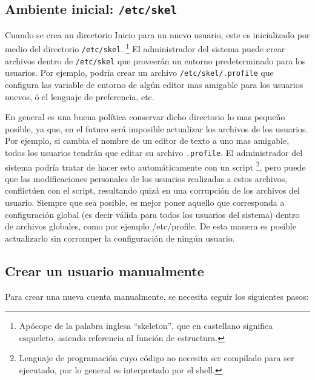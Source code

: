 \documentclass[12pt]{article}
\begin{document}
\subsection*{Ambiente inicial: \texttt{/etc/skel}}

Cuando se crea un directorio Inicio para un nuevo usuario, este es
inicializado por medio del directorio \texttt{/etc/skel}. 
\footnote{Apócope de la palabra inglesa ``skeleton'', que en castellano 
significa esqueleto, asiendo referencia al función de estructura.} El
administrador del sistema puede crear archivos dentro de
\texttt{/etc/skel} que proveerán un entorno predeterminado
para los usuarios. Por ejemplo, podría crear un archivo 
\texttt{/etc/skel/.profile} que configura las variable de entorno
de algún editor mas amigable para los usuarios nuevos, ó el lenguaje 
de preferencia, etc. 


En general es una buena política conservar dicho directorio lo mas pequeño
posible, ya que, en el futuro será imposible actualizar los archivos de
los usuarios. Por ejemplo, si cambia el nombre de un editor de texto a uno mas amigable,
todos los usuarios tendrán que editar su archivo  \texttt{.profile}.
El administrador del sistema podría tratar de hacer esto automáticamente con un
script \footnote{Lenguaje de programación cuyo código no necesita ser
compilado para ser ejecutado, por lo general es interpretado por el shell.}, pero
puede que las modificaciones personales de los usuarios realizadas a estos 
archivos, conflictúen con el script, resultando quizá en una corrupción de 
los archivos del usuario. Siempre que sea posible, es mejor poner aquello que 
corresponda a configuración global (es decir válida para todos los usuarios del sistema)
dentro de archivos globales, como por ejemplo /etc/profile. De esta manera es posible
actualizarlo sin corromper la configuración de ningún usuario.  



\subsection*{Crear un usuario manualmente}

Para crear una nueva cuenta manualmente, se necesita seguir los siguientes pasos:
\end{document}
